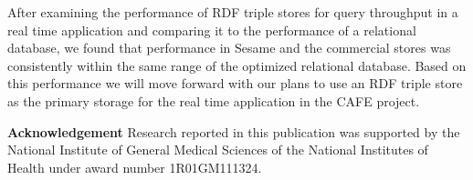 \documentclass{llncs}
\begin{document}
After examining the performance of RDF triple stores for query throughput in a real time application and comparing it to the performance of a relational database, we found that performance in Sesame and the commercial stores was consistently within the same range of the optimized relational database.
Based on this performance we will move forward with our plans to use an RDF triple store as the primary storage for the real time application in the CAFE project.

\medskip
\noindent
\textbf{Acknowledgement} Research reported in this publication was supported by the National Institute of General Medical Sciences of the National Institutes of Health under award number 1R01GM111324.



\end{document}
